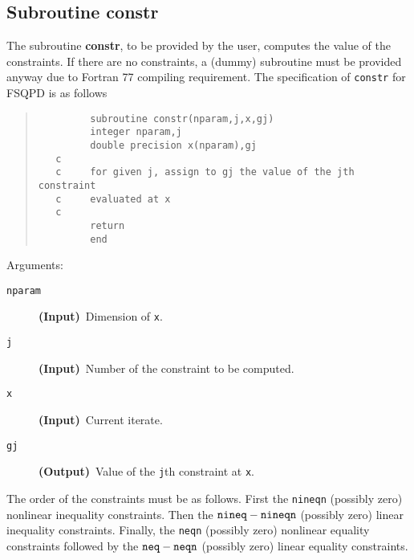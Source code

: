 \subsection{Subroutine constr}
The subroutine {\bf constr}, to be provided by the user, 
computes the value of 
the constraints. If there are no constraints, 
a (dummy) subroutine must be
provided anyway due to Fortran 77 compiling requirement.
The specification of {\tt constr} for FSQPD is as follows
\begin{quote}
\begin{verbatim}
         subroutine constr(nparam,j,x,gj)
         integer nparam,j
         double precision x(nparam),gj
   c
   c     for given j, assign to gj the value of the jth constraint 
   c     evaluated at x
   c
         return
         end
\end{verbatim}
\end{quote}
\noindent Arguments:
\begin{description}
\item[\tt nparam]  {\bf (Input)}~Dimension of {\tt x}.
\item[\tt j]    {\bf (Input)}~Number of the constraint to be computed. 
\item[\tt x]    {\bf (Input)}~Current iterate.
\item[\tt gj]   {\bf (Output)}~Value of the {\tt j}th constraint at {\tt x}.
\end{description}
\bigskip
The order of the constraints must be as follows. 
First the {\tt nineqn} (possibly zero) nonlinear inequality constraints. 
Then the ${\tt nineq-nineqn}$ (possibly zero) linear inequality constraints. 
Finally, the {\tt neqn} (possibly zero) nonlinear equality constraints
followed by the ${\tt neq-neqn}$ (possibly zero) linear equality constraints.

